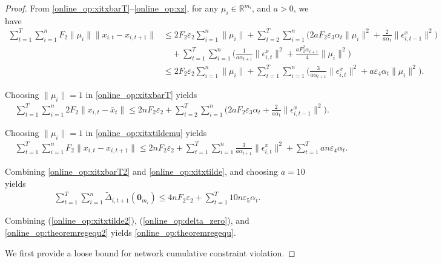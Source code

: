 \documentclass[12pt,draftcls,onecolumn]{IEEEtran}%
\begin{document}
\begin{proof}
From \eqref{online_op:xitxbarT}--\eqref{online_op:xz}, for any $\mu_i\in\mathbb{R}^{m_i}$, and $a>0$, we have
\begin{align}\label{online_op:xitxtildemu}
\sum_{t=1}^{T}\sum_{i=1}^nF_2\|\mu_i\|\|x_{i,t}-x_{i,t+1}\|
&\le 2F_2\varepsilon_2\sum_{i=1}^n\|\mu_i\|
+\sum_{t=2}^{T}\sum_{i=1}^n\Big(2aF_2\varepsilon_3\alpha_t\|\mu_i\|^2
+\frac{2}{a\alpha_t}\|\epsilon^x_{i,t-1}\|^2\Big)\nonumber\\
&\quad+\sum_{t=1}^{T}\sum_{i=1}^n
\Big(\frac{1}{a\alpha_{t+1}}\|\epsilon^x_{i,t}\|^2
+\frac{aF_2^2\alpha_{t+1}}{4}\|\mu_i\|^2\Big)\nonumber\\
&\le 2F_2\varepsilon_2\sum_{i=1}^n\|\mu_i\|
+\sum_{t=1}^{T}\sum_{i=1}^n\Big(\frac{3}{a\alpha_{t+1}}\|\epsilon^x_{i,t}\|^2
+a\varepsilon_4\alpha_{t}\|\mu_i\|^2\Big).
\end{align}

Choosing $\|\mu_i\|=1$ in \eqref{online_op:xitxbarT} yields
\begin{align}
&\sum_{t=1}^{T}\sum_{i=1}^n2F_2\|x_{i,t}-\bar{x}_{t}\|\le 2nF_2\varepsilon_2
+\sum_{t=2}^{T}\sum_{i=1}^n\Big(2aF_2\varepsilon_3\alpha_t
+\frac{2}{a\alpha_t}\|\epsilon^x_{i,t-1}\|^2\Big).
\label{online_op:xitxbarT2}
\end{align}

Choosing $\|\mu_i\|=1$ in \eqref{online_op:xitxtildemu} yields
\begin{align}\label{online_op:xitxtilde}
&\sum_{t=1}^{T}\sum_{i=1}^nF_2\|x_{i,t}-x_{i,t+1}\|\le 2nF_2\varepsilon_2
+\sum_{t=1}^{T}\sum_{i=1}^n\frac{3}{a\alpha_{t+1}}\|\epsilon^x_{i,t}\|^2
+\sum_{t=1}^{T}an\varepsilon_4\alpha_{t}.
\end{align}

Combining \eqref{online_op:xitxbarT2} and \eqref{online_op:xitxtilde}, and choosing $a=10$ yields
\begin{align}\label{online_op:xitxtilde2}
\sum_{t=1}^{T}\sum_{i=1}^n\tilde{\Delta}_{i,t+1}(\bm{0}_{m_i})\le 4nF_2\varepsilon_2
+\sum_{t=1}^{T}10n\varepsilon_5\alpha_{t}.
\end{align}





 Combining (\ref{online_op:xitxtilde2}), (\ref{online_op:delta_zero}), and \eqref{online_op:theoremregequ2} yields \eqref{online_op:theoremregequ}.





 We first provide a loose bound for network  cumulative constraint violation.



\end{proof}
\end{document}
